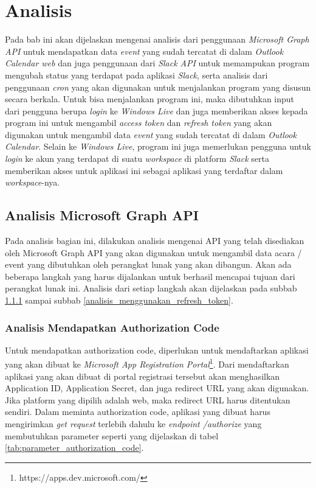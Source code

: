 \chapter{Analisis}
\label{chap:analisis}

Pada bab ini akan dijelaskan mengenai analisis dari penggunaan \textit{Microsoft Graph API} untuk mendapatkan data \textit{event} yang sudah tercatat di dalam \textit{Outlook Calendar web} dan juga penggunaan dari \textit{Slack API} untuk memampukan program mengubah status yang terdapat pada aplikasi \textit{Slack}, serta analisis dari penggunaan \textit{cron} yang akan digunakan untuk menjalankan program yang disusun secara berkala. Untuk bisa menjalankan program ini, maka dibutuhkan input dari pengguna berupa \textit{login} ke \textit{Windows Live} dan juga memberikan akses kepada program ini untuk mengambil \textit{access token} dan \textit{refresh token} yang akan digunakan untuk mengambil data \textit{event} yang sudah tercatat di dalam \textit{Outlook Calendar}. Selain ke \textit{Windows Live}, program ini juga memerlukan pengguna untuk \textit{login} ke akun yang terdapat di suatu \textit{workspace} di platform \textit{Slack} serta memberikan akses untuk aplikasi ini sebagai aplikasi yang terdaftar dalam \textit{workspace}-nya.  

\section{Analisis Microsoft Graph API}
\label{sec:analisis_microsoft_graph_api}

Pada analisis bagian ini, dilakukan analisis mengenai API yang telah disediakan oleh Microsoft Graph API yang akan digunakan untuk mengambil data acara / event yang dibutuhkan oleh perangkat lunak yang akan dibangun. Akan ada beberapa langkah yang harus dijalankan untuk berhasil mencapai tujuan dari perangkat lunak ini. Analisis dari setiap langkah akan dijelaskan pada subbab \ref{analisis_authorization_code} sampai subbab \ref{analisis_menggunakan_refresh_token}.

\subsection{Analisis Mendapatkan Authorization Code}
\label{analisis_authorization_code}
Untuk mendapatkan authorization code, diperlukan untuk mendaftarkan aplikasi yang akan dibuat ke \textit{Microsoft App Registration Portal}\footnote{https://apps.dev.microsoft.com/}. Dari mendaftarkan aplikasi yang akan dibuat di portal registrasi tersebut akan menghasilkan Application ID, Application Secret, dan juga redirect URL yang akan digunakan. Jika platform yang dipilih adalah web, maka redirect URL harus ditentukan sendiri. Dalam meminta authorization code, aplikasi yang dibuat harus mengirimkan \textit{get request} terlebih dahulu ke \textit{endpoint /authorize} yang membutuhkan parameter seperti yang dijelaskan di tabel \ref{tab:parameter_authorization_code}. 

